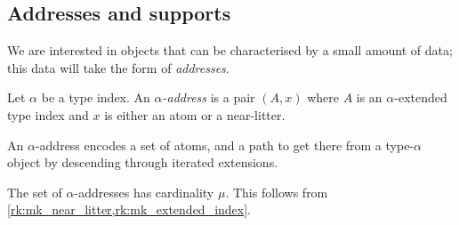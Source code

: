 \subsection{Addresses and supports}

We are interested in objects that can be characterised by a small amount of data; this data will take the form of \emph{addresses}.
\begin{definition}
    Let \( \alpha \) be a type index.
    An \emph{\( \alpha \)-address} is a pair \( (A, x) \) where \( A \) is an \( \alpha \)-extended type index and \( x \) is either an atom or a near-litter.
\end{definition}
An \( \alpha \)-address encodes a set of atoms, and a path to get there from a type-\( \alpha \) object by descending through iterated extensions.
\begin{remark}
    \label{rk:mk_address}
    The set of \( \alpha \)-addresses has cardinality \( \mu \).
    This follows from \cref{rk:mk_near_litter,rk:mk_extended_index}.
\end{remark}

